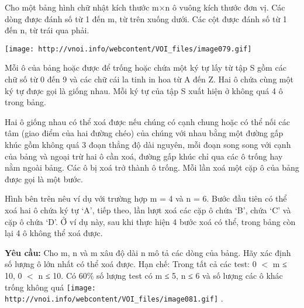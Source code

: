 Cho một bảng hình chữ nhật kích thước m×n ô vuông kích thước đơn vị. Các dòng được đánh số từ 1 đến m, từ trên xuống dưới. Các cột được đánh số từ 1 đến n, từ trái qua phải.


\texttt{[image: http://vnoi.info/webcontent/VOI\_files/image079.gif]}

Mỗi ô của bảng hoặc được để trống hoặc chứa một ký tự lấy từ tập S gồm các chữ số từ 0 đến 9 và các chữ cái la tinh in hoa từ A đến Z. Hai ô chứa cùng một ký tự được gọi là giống nhau. Mỗi ký tự của tập S xuất hiện ở không quá 4 ô trong bảng.

Hai ô giống nhau có thể xoá được nếu chúng có cạnh chung hoặc có thể nối các tâm (giao điểm của hai đường chéo) của chúng với nhau bằng một đường gấp khúc gồm không quá 3 đoạn thẳng độ dài nguyên, mỗi đoạn song song với cạnh của bảng và ngoại trừ hai ô cần xoá, đường gấp khúc chỉ qua các ô trống hay nằm ngoài bảng. Các ô bị xoá trở thành ô trống. Mỗi lần xoá một cặp ô của bảng được gọi là một bước.

Hình bên trên nêu ví dụ với trường hợp m = 4 và n = 6. Bước đầu tiên có thể xoá hai ô chứa ký tự ‘A’, tiếp theo, lần lượt xoá các cặp ô chứa ‘B’, chứa ‘C’ và cặp ô chứa ‘D’. Ở ví dụ này, sau khi thực hiện 4 bước xoá có thể, trong bảng còn lại 4 ô không thể xoá được.

\textbf{Yêu cầu: } Cho m, n và m xâu độ dài n mô tả các dòng của bảng. Hãy xác định số lượng ô lớn nhất có thể xoá được.
Hạn chế:
Trong tất cả các test: 0 $<$ m ≤ 10, 0 $<$ n ≤ 10. Có 60\% số lượng test có m ≤ 5, n ≤ 6 và số lượng các ô khác trống không quá 
\texttt{[image: http://vnoi.info/webcontent/VOI\_files/image081.gif]} .